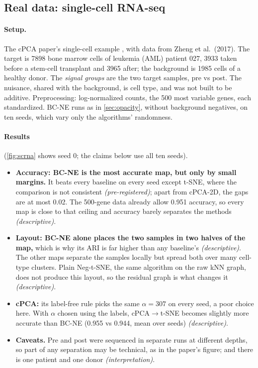 \documentclass[10pt]{article}
\newcommand{\methodname}{BC-NE}
\newcommand{\cpre}{\textit{\small (pre-registered)}}
\newcommand{\cdesc}{\textit{\small (descriptive)}}
\newcommand{\cinterp}{\textit{\small (interpretation)}}
\begin{document}
\clearpage
\subsection{Real data: single-cell RNA-seq}
\label{sec:scrna}

\paragraph{Setup.} The cPCA paper's single-cell example \cite{abid2018cpca}, with data from Zheng et al.\ (2017). The target is 7898 bone marrow cells of leukemia (AML) patient 027, 3933 taken before a stem-cell transplant and 3965 after; the background is 1985 cells of a healthy donor. The \emph{signal groups} are the two target samples, pre vs post. The nuisance, shared with the background, is cell type, and was not built to be additive. Preprocessing: log-normalized counts, the 500 most variable genes, each standardized. \methodname{} runs as in \cref{sec:opacity}, without background negatives, on ten seeds, which vary only the algorithms' randomness.

\paragraph{Results} (\cref{fig:scrna} shows seed 0; the claims below use all ten seeds).
\begin{itemize}
  \item \textbf{Accuracy: \methodname{} is the most accurate map, but only by small margins.} It beats every baseline on every seed except t-SNE, where the comparison is not consistent \cpre; apart from cPCA-2D, the gaps are at most 0.02. The 500-gene data already allow 0.951 accuracy, so every map is close to that ceiling and accuracy barely separates the methods \cdesc.
  \item \textbf{Layout: \methodname{} alone places the two samples in two halves of the map,} which is why its ARI is far higher than any baseline's \cdesc. The other maps separate the samples locally but spread both over many cell-type clusters. Plain Neg-t-SNE, the same algorithm on the raw kNN graph, does not produce this layout, so the residual graph is what changes it \cdesc.
  \item \textbf{cPCA:} its label-free rule picks the same $\alpha = 307$ on every seed, a poor choice here. With $\alpha$ chosen using the labels, cPCA$\to$t-SNE becomes slightly more accurate than \methodname{} (0.955 vs 0.944, mean over seeds) \cdesc.
  \item \textbf{Caveats.} Pre and post were sequenced in separate runs at different depths, so part of any separation may be technical, as in the paper's figure; and there is one patient and one donor \cinterp.
\end{itemize}
\end{document}
